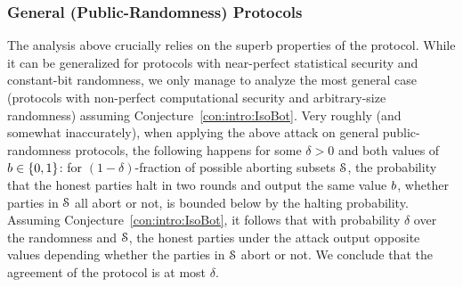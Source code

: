 \subsubsection{General (Public-Randomness) Protocols}\label{sec:technique:3:2}
The analysis above crucially relies on the superb properties of the protocol. While it can be generalized for protocols with near-perfect statistical security and constant-bit randomness, we only manage to analyze the most general case (\ie protocols with non-perfect computational security and arbitrary-size randomness) assuming Conjecture~\ref{con:intro:IsoBot}. Very roughly (and somewhat inaccurately), when applying the above attack on general public-randomness protocols, the following happens for some $\delta>0$ and both values of $b\in \{0,1\}$: for $(1-\delta)$-fraction of possible aborting subsets $\mathcal{S}$, the probability that the honest parties halt in two rounds and output the same value $b$, whether parties in $\mathcal{S}$ all abort or not, is bounded below by the halting probability. Assuming Conjecture~\ref{con:intro:IsoBot}, it follows that with probability $\delta$ over the randomness and $\mathcal{S}$, the honest parties under the attack output opposite values depending whether the parties in ${\cal{S}}$ abort or not. We conclude that the agreement of the protocol is at most $\delta$. 

